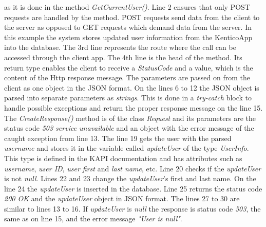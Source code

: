 as it is done in the method \textit{GetCurrentUser()}.
Line 2 ensures that only POST requests are handled by the method. POST requests send data from the client to the server as opposed to GET requests which demand data from the server. In this example the system stores updated user information from the KenticoApp into the database. The 3rd line represents the route where the call can be accessed through the client app. The 4th line is the head of the method. Its return type enables the client to receive a \textit{StatusCode} and a value, which is the content of the Http response message. The parameters are passed on from the client as one object in the JSON format. On the lines 6 to 12 the JSON object is parsed into separate parameters as \textit{strings}. This is done in a \textit{try-catch} block to handle possible exceptions and return the proper response message on the line 15. The \textit{CreateResponse()} method is of the class \textit{Request} and its parameters are the status code \textit{503 service unavailable} and an object with the error message of the caught exception from line 13. The line 19 gets the user with the parsed \textit{username} and stores it in the variable called \textit{updateUser} of the type \textit{UserInfo}. This type is defined in the KAPI documentation and has attributes such as \textit{username}, \textit{user ID}, \textit{user first} and \textit{last name}, etc. Line 20 checks if the \textit{updateUser} is not \textit{null}. Lines 22 and 23 change the \textit{updateUser}'s first and last name. On the line 24 the \textit{updateUser} is inserted in the database. Line 25 returns the status code \textit{200 OK} and the \textit{updateUser} object in JSON format. The lines 27 to 30 are similar to lines 13 to 16. If \textit{updateUser} is \textit{null} the response is status code \textit{503}, the same as on line 15, and the error message \textit{"User is null"}. 

